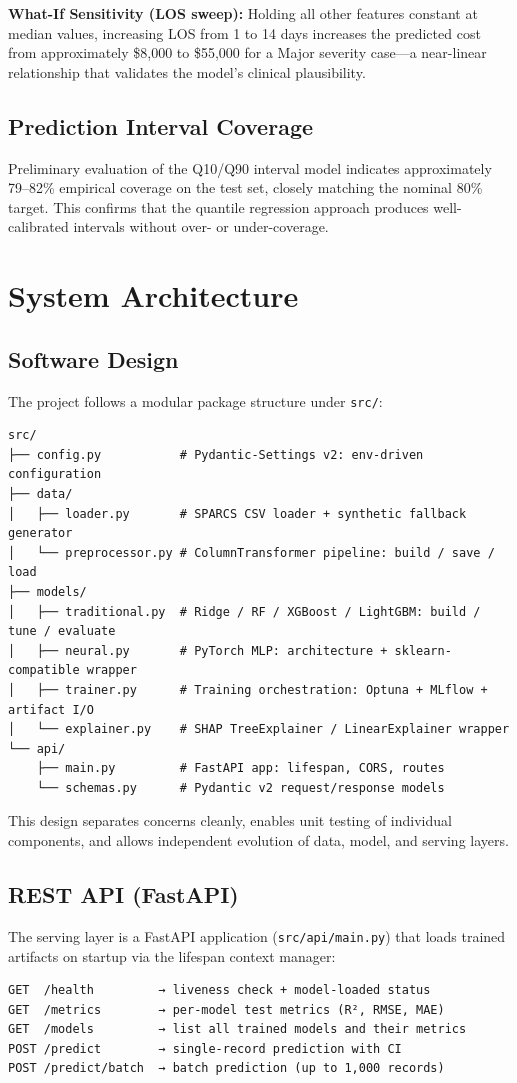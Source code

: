 \documentclass[11pt,a4paper]{article}
\begin{document}
\textbf{What-If Sensitivity (LOS sweep):} Holding all other features constant at median values, increasing LOS from 1 to 14 days increases the predicted cost from approximately \$8,000 to \$55,000 for a Major severity case---a near-linear relationship that validates the model's clinical plausibility.

\subsection{Prediction Interval Coverage}
Preliminary evaluation of the Q10/Q90 interval model indicates approximately 79--82\% empirical coverage on the test set, closely matching the nominal 80\% target. This confirms that the quantile regression approach produces well-calibrated intervals without over- or under-coverage.

\section{System Architecture}
\subsection{Software Design}
The project follows a modular package structure under \texttt{src/}:
\begin{verbatim}
src/
├── config.py           # Pydantic-Settings v2: env-driven configuration
├── data/
│   ├── loader.py       # SPARCS CSV loader + synthetic fallback generator
│   └── preprocessor.py # ColumnTransformer pipeline: build / save / load
├── models/
│   ├── traditional.py  # Ridge / RF / XGBoost / LightGBM: build / tune / evaluate
│   ├── neural.py       # PyTorch MLP: architecture + sklearn-compatible wrapper
│   ├── trainer.py      # Training orchestration: Optuna + MLflow + artifact I/O
│   └── explainer.py    # SHAP TreeExplainer / LinearExplainer wrapper
└── api/
    ├── main.py         # FastAPI app: lifespan, CORS, routes
    └── schemas.py      # Pydantic v2 request/response models
\end{verbatim}

This design separates concerns cleanly, enables unit testing of individual components, and allows independent evolution of data, model, and serving layers.

\subsection{REST API (FastAPI)}
The serving layer is a FastAPI application (\texttt{src/api/main.py}) that loads trained artifacts on startup via the lifespan context manager:
\begin{verbatim}
GET  /health         → liveness check + model-loaded status
GET  /metrics        → per-model test metrics (R², RMSE, MAE)
GET  /models         → list all trained models and their metrics
POST /predict        → single-record prediction with CI
POST /predict/batch  → batch prediction (up to 1,000 records)
\end{verbatim}
\end{document}
